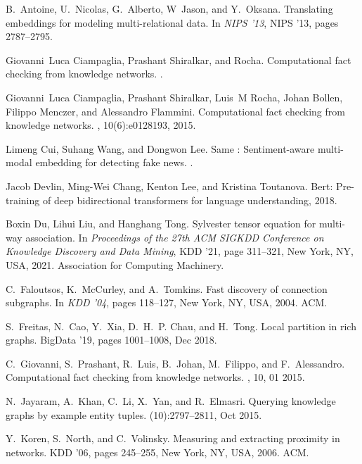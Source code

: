 \documentclass[11pt]{article}
\begin{document}
\begin{thebibliography}{10}

B.~Antoine, U.~Nicolas, G.~Alberto, W~Jason, and Y.~Oksana.
\newblock Translating embeddings for modeling multi-relational data.
\newblock In {\em NIPS '13}, NIPS '13, pages 2787--2795.

Giovanni~Luca Ciampaglia, Prashant Shiralkar, and Rocha.
\newblock Computational fact checking from knowledge networks.
.

Giovanni~Luca Ciampaglia, Prashant Shiralkar, Luis~M Rocha, Johan Bollen,
  Filippo Menczer, and Alessandro Flammini.
\newblock Computational fact checking from knowledge networks.
, 10(6):e0128193, 2015.

Limeng Cui, Suhang Wang, and Dongwon Lee.
\newblock Same : Sentiment-aware multi-modal embedding for detecting fake news.
.

Jacob Devlin, Ming-Wei Chang, Kenton Lee, and Kristina Toutanova.
\newblock Bert: Pre-training of deep bidirectional transformers for language
  understanding, 2018.

Boxin Du, Lihui Liu, and Hanghang Tong.
\newblock Sylvester tensor equation for multi-way association.
\newblock In {\em Proceedings of the 27th ACM SIGKDD Conference on Knowledge
  Discovery and Data Mining}, KDD '21, page 311–321, New York, NY, USA, 2021.
  Association for Computing Machinery.

C.~Faloutsos, K.~McCurley, and A.~Tomkins.
\newblock Fast discovery of connection subgraphs.
\newblock In {\em KDD '04}, pages 118--127, New York, NY, USA, 2004. ACM.

S.~{Freitas}, N.~{Cao}, Y.~{Xia}, D.~H.~P. {Chau}, and H.~{Tong}.
\newblock Local partition in rich graphs.
\newblock BigData '19, pages 1001--1008, Dec 2018.

C.~Giovanni, S.~Prashant, R.~Luis, B.~Johan, M.~Filippo, and F.~Alessandro.
\newblock Computational fact checking from knowledge networks.
, 10, 01 2015.

N.~{Jayaram}, A.~{Khan}, C.~{Li}, X.~{Yan}, and R.~{Elmasri}.
\newblock Querying knowledge graphs by example entity tuples.
(10):2797--2811, Oct 2015.

Y.~Koren, S.~North, and C.~Volinsky.
\newblock Measuring and extracting proximity in networks.
\newblock KDD '06, pages 245--255, New York, NY, USA, 2006. ACM.


\end{thebibliography}
\end{document}
